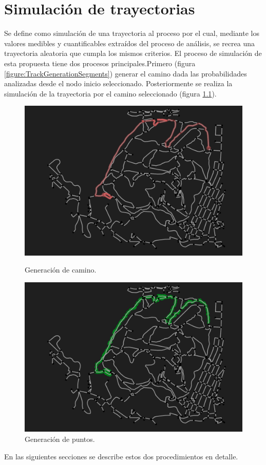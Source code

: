 
\chapter{Simulación de trayectorias} \label{chapter:Simulation}
Se define como simulación de una trayectoria al proceso por el cual, mediante los valores 
medibles y cuantificables extraídos del proceso de análisis, se recrea una trayectoria aleatoria que 
cumpla los mismos criterios. El proceso de simulación de esta propuesta tiene dos procesos 
principales.Primero (figura  \ref{figure:TrackGenerationSegments}) generar el camino dada las 
probabilidades analizadas desde el nodo inicio seleccionado. Posteriormente se realiza la simulación 
de la trayectoria por el camino seleccionado (figura \ref{figure:TrackGenerationPoints}).
\begin{figure}[!htb]
\begin{minipage}{0.48\textwidth}
\centering
\includegraphics[width=1\textwidth]{./Imagenes/TrackGenerationSegments.png}
\caption{Generación de camino.}
\label{figure:TrackGenerationSegments}
\end{minipage}\hfill
\begin{minipage}{0.48\textwidth}
\centering
\includegraphics[width=1\textwidth]{./Imagenes/TrackGenerationPoints.png}
\caption{Generación de puntos.}
\label{figure:TrackGenerationPoints}
\end{minipage}
\end{figure}
\newpage
En las siguientes secciones se describe estos dos procedimientos en detalle.

